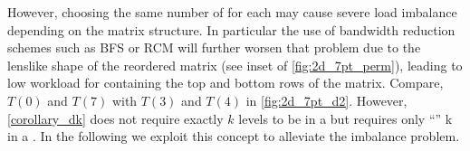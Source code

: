 However, choosing the same number of \levels for each \levelGroup may
cause severe load imbalance depending on the matrix structure. In
particular the use of bandwidth reduction schemes such as BFS or RCM
will further worsen that problem due to the lenslike shape of the
reordered matrix (see inset of \cref{fig:2d_7pt_perm}), leading to low
workload for \levelGroups containing the top and bottom rows of the
  matrix. Compare, \eg $T(0)$ and $T(7)$ with $T(3)$ and $T(4)$ in
\cref{fig:2d_7pt_d2}. However, \cref{corollary_dk} does not require
exactly $k$ levels to be in a \levelGroup but  
requires only ``\atleast'' k \levels in a \levelGroup. In
the following we exploit this concept to alleviate the imbalance
problem.
  
